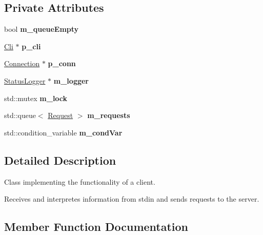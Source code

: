 \subsection*{Private Attributes}
\begin{DoxyCompactItemize}
\item 
\mbox{\label{classClient_af89fd2c87147e9cff108e31216e2da7c}} 
bool {\bfseries m\+\_\+queue\+Empty}
\item 
\mbox{\label{classClient_a48826e6a4fbfb261da3782405cd2558e}} 
\hyperlink{classCli}{Cli} $\ast$ {\bfseries p\+\_\+cli}
\item 
\mbox{\label{classClient_a086555f6a435428891d5f237cd454c88}} 
\hyperlink{classConnection}{Connection} $\ast$ {\bfseries p\+\_\+conn}
\item 
\mbox{\label{classClient_a7b52eca764467f822b38a23dce59534d}} 
\hyperlink{classStatusLogger}{Status\+Logger} $\ast$ {\bfseries m\+\_\+logger}
\item 
\mbox{\label{classClient_a462027dc8a1d8e8beb83ed980d367692}} 
std\+::mutex {\bfseries m\+\_\+lock}
\item 
\mbox{\label{classClient_a0ee7fb4acbf0301e0826a115e1969ae2}} 
std\+::queue$<$ \hyperlink{classRequest}{Request} $>$ {\bfseries m\+\_\+requests}
\item 
\mbox{\label{classClient_a6f55a103018fb22ab8890c99d7fc405e}} 
std\+::condition\+\_\+variable {\bfseries m\+\_\+cond\+Var}
\end{DoxyCompactItemize}


\subsection{Detailed Description}
Class implementing the functionality of a client. 

Receives and interpretes information from stdin and sends requests to the server. 

\subsection{Member Function Documentation}
\mbox{\label{classClient_abd9bf3421bbc1e0ad11685cc95af53a8}} 
